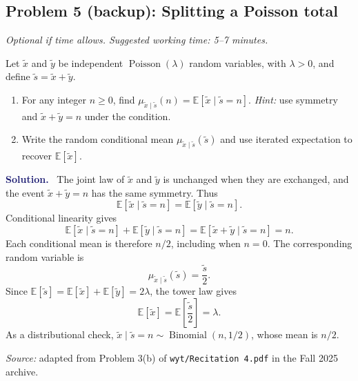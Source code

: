 \documentclass[11pt]{article}
\newif\ifsolutions
\newcommand{\E}{\mathbb{E}}
\newcommand{\rv}[1]{\widetilde{#1}}
\newenvironment{answer}{%
    \par\medskip\noindent\textcolor{MidnightBlue}{\textbf{Solution.}}\ }
    {\par\medskip}
\newcommand{\workingspace}[1]{}
\newcommand{\workingspace}[1]{\vspace{#1}}
\begin{document}
\newpage
\subsection*{Problem 5 (backup): Splitting a Poisson total}
\noindent\textit{Optional if time allows. Suggested working time: 5--7 minutes.}
\medskip

Let $\rv{x}$ and $\rv{y}$ be independent
$\operatorname{Poisson}(\lambda)$ random variables, with $\lambda>0$,
and define $\rv{s}=\rv{x}+\rv{y}$.
\begin{enumerate}
  \item For any integer $n\geq0$, find
    $\mu_{\rv{x}\mid\rv{s}}(n)=\E[\rv{x}\mid\rv{s}=n]$.
    \textit{Hint:} use symmetry and $\rv{x}+\rv{y}=n$ under the condition.
  \item Write the random conditional mean
    $\mu_{\rv{x}\mid\rv{s}}(\rv{s})$ and use iterated expectation
    to recover $\E[\rv{x}]$.
\end{enumerate}
\workingspace{7cm}

\begin{answer}
The joint law of $\rv{x}$ and $\rv{y}$ is unchanged when they are exchanged,
and the event $\rv{x}+\rv{y}=n$ has the same symmetry. Thus
\[
  \E[\rv{x}\mid\rv{s}=n]=\E[\rv{y}\mid\rv{s}=n].
\]
Conditional linearity gives
\[
  \E[\rv{x}\mid\rv{s}=n]+\E[\rv{y}\mid\rv{s}=n]
  =\E[\rv{x}+\rv{y}\mid\rv{s}=n]=n.
\]
Each conditional mean is therefore $\boxed{n/2}$, including when $n=0$.
The corresponding random variable is
\[
  \boxed{\mu_{\rv{x}\mid\rv{s}}(\rv{s})=\frac{\rv{s}}2.}
\]
Since $\E[\rv{s}]=\E[\rv{x}]+\E[\rv{y}]=2\lambda$, the tower law gives
\[
  \E[\rv{x}]=\E\!\left[\frac{\rv{s}}2\right]=\lambda.
\]
As a distributional check,
$\rv{x}\mid\rv{s}=n\sim\operatorname{Binomial}(n,1/2)$,
whose mean is $n/2$.
\end{answer}

\vfill
\noindent\textit{Source:} adapted from Problem 3(b) of
\texttt{wyt/Recitation 4.pdf} in the Fall 2025 archive.

\ifsolutions
\newpage
\end{document}
